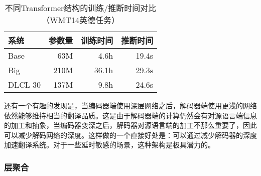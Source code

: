 \begin{table}[htp]
\centering
\caption{不同Transformer结构的训练/推断时间对比（WMT14英德任务）}
\begin{tabular}{l | r r r}
\rule{0pt}{15pt}     系统 & 参数量 & 训练时间 & 推断时间  \\
\hline
\rule{0pt}{15pt}     Base & 63M & 4.6h & 19.4s  \\
\rule{0pt}{15pt}     Big & 210M & 36.1h & 29.3s  \\
\rule{0pt}{15pt}     DLCL-30 & 137M & 9.8h & 24.6s  \\
\end{tabular}
\label{tab:7-6}
\end{table}

\parinterval 还有一个有趣的发现是，当编码器端使用深层网络之后，解码器端使用更浅的网络依然能够维持相当的翻译品质。这是由于解码器端的计算仍然会有对源语言端信息的加工和抽象，当编码器变深之后，解码器对源语言端的加工不那么重要了，因此可以减少解码网络的深度。这样做的一个直接好处是：可以通过减少解码器的深度加速翻译系统。对于一些延时敏感的场景，这种架构是极具潜力的。


\subsubsection{层聚合}

